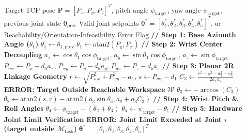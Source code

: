 \documentclass[journal]{IEEEtran}
\begin{document}
\begin{algorithm}[!t]
\caption{ARIA Closed-Form Analytical 5-DoF Inverse Kinematics Solver on $\mathcal{M}_{\text{task}}$}
\label{alg_analytical_ik}
\begin{algorithmic}[1]
\REQUIRE Target TCP pose $\mathbf{P} = [P_x, P_y, P_z]^T$, pitch angle $\phi_{\text{target}}$, yaw angle $\psi_{\text{target}}$, previous joint state $\boldsymbol{\theta}_{\text{prev}}$
\ENSURE Valid joint setpoints $\boldsymbol{\theta}^* = [\theta_1^*, \theta_2^*, \theta_3^*, \theta_4^*, \theta_5^*]^T$, or Reachability/Orientation-Infeasibility Error Flag
\STATE \textbf{// Step 1: Base Azimuth Angle ($\theta_1$)}
    \STATE $\theta_1 \leftarrow \theta_{1, \text{prev}}$ 
\ELSE
    \STATE $\theta_1 \leftarrow \text{atan2}(P_y, P_x)$
\ENDIF
\STATE \textbf{// Step 2: Wrist Center Decoupling}
\STATE $a_x \leftarrow \cos\theta_1 \cos\phi_{\text{target}}$, $a_y \leftarrow \sin\theta_1 \cos\phi_{\text{target}}$, $a_z \leftarrow \sin\phi_{\text{target}}$
\STATE $P_{wx} \leftarrow P_x - d_5 a_x$, $P_{wy} \leftarrow P_y - d_5 a_y$, $P_{wz} \leftarrow P_z - d_5 a_z$
\STATE \textbf{// Step 3: Planar 2R Linkage Geometry}
\STATE $r \leftarrow \sqrt{P_{wx}^2 + P_{wy}^2} - a_1$, $s \leftarrow P_{wz} - d_1$
\STATE $C_3 \leftarrow \frac{r^2 + s^2 - a_2^2 - a_3^2}{2 a_2 a_3}$
    \RETURN \textbf{ERROR: Target Outside Reachable Workspace $\mathcal{W}$}
\ENDIF
\STATE $\theta_3 \leftarrow -\arccos(C_3)$ 
\STATE $\theta_2 \leftarrow \text{atan2}(s, r) - \text{atan2}(a_3 \sin\theta_3, a_2 + a_3 C_3)$
\STATE \textbf{// Step 4: Wrist Pitch \& Roll Angles}
\STATE $\theta_4 \leftarrow \phi_{\text{target}} - (\theta_2 + \theta_3)$
\STATE $\theta_5 \leftarrow \psi_{\text{target}} - \theta_1$
\STATE \textbf{// Step 5: Hardware Joint Limit Verification}
        \RETURN \textbf{ERROR: Joint Limit Exceeded at Joint $i$ (target outside $\mathcal{M}_{\text{task}}$)}
    \ENDIF
\ENDFOR
\RETURN $\boldsymbol{\theta}^* = [\theta_1, \theta_2, \theta_3, \theta_4, \theta_5]^T$
\end{algorithmic}
\end{algorithm}
\end{document}
